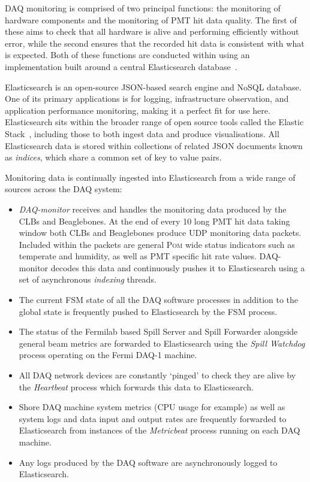 \chipsfive DAQ monitoring is comprised of two principal functions: the monitoring of hardware
components and the monitoring of PMT hit data quality. The first of these aims to check that all
hardware is alive and performing efficiently without error, while the second ensures that the
recorded hit data is consistent with what is expected. Both of these functions are conducted
within \chipsfive using an implementation built around a central Elasticsearch
database~\cite{elasticsearch2020}.

Elasticsearch is an open-source JSON-based search engine and NoSQL database. One of its primary
applications is for logging, infrastructure observation, and application performance monitoring,
making it a perfect fit for use here. Elasticsearch sits within the broader range of open source
tools called the Elastic Stack~\cite{elasticstack2020}, including those to both ingest data and
produce visualisations. All Elasticsearch data is stored within collections of related JSON
documents known as \emph{indices}, which share a common set of key to value pairs.

Monitoring data is continually ingested into Elasticsearch from a wide range of sources across the
\chipsfive DAQ system:
\begin{itemize}
    \item \emph{DAQ-monitor} receives and handles the monitoring data produced by the CLBs and
    Beaglebones. At the end of every \unit{10}{} long PMT hit data taking window both
    CLBs and Beaglebones produce UDP monitoring data packets. Included within the packets are
    general \textsc{Pom} wide status indicators such as temperate and humidity, as well as PMT
    specific hit rate values. DAQ-monitor decodes this data and continuously pushes it to
    Elasticsearch using a set of asynchronous \emph{indexing} threads.
    \item The current FSM state of all the DAQ software processes in addition to the global state
    is frequently pushed to Elasticsearch by the FSM process.
    \item The status of the Fermilab based Spill Server and Spill Forwarder alongside general
    \numi beam metrics are forwarded to Elasticsearch using the \emph{Spill Watchdog} process
    operating on the Fermi DAQ-1 machine.
    \item All DAQ network devices are constantly `pinged' to check they are alive by the
    \emph{Heartbeat} process which forwards this data to Elasticsearch.
    \item Shore DAQ machine system metrics (CPU usage for example) as well as system logs and data
    input and output rates are frequently forwarded to Elasticsearch from instances of the
    \emph{Metricbeat} process running on each DAQ machine.
    \item Any logs produced by the DAQ software are asynchronously logged to Elasticsearch.
\end{itemize}

